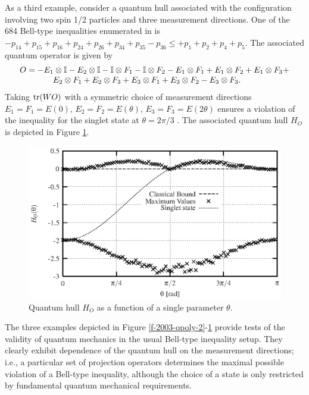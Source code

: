 As a third example, consider a quantum hull associated with the
configuration involving two spin 1/2 particles and
three measurement directions. One of the 684 Bell-type inequalities enumerated in
\cite{2000-poly} is
$  - p_{14} + p_{15} + p_{16} +
  p_{24} + p_{26} + p_{34} + p_{35} - p_{36} \leq +p_{1}+ p_{2} + p_{4} + p_{5}$.
The associated quantum operator is given by
\begin{equation}
\begin{array}{l}
  O=- {E}_1 \otimes {\Bbb I} - {E}_2 \otimes {\Bbb I} - {\Bbb I} \otimes {F}_1 - {\Bbb I} \otimes
  {F}_2 -
  {E}_1 \otimes {F}_1 + {E}_1 \otimes {F}_2 + {E}_1 \otimes {F}_3 +\\
\qquad \qquad {E}_2
  \otimes {F}_1 + {E}_2 \otimes {F}_3 +
  {E}_3 \otimes {F}_1 + {E}_3 \otimes {F}_2 - {E}_3 \otimes {F}_3.
\end{array}
  \label{e-2003-poly-xyz}
\end{equation}
Taking ${\rm tr}(WO)$ with a symmetric choice of measurement
directions
${E}_1={F}_1=E(0)$,
${E}_2={F}_2=E(\theta)$,
${E}_3={F}_3=E(2\theta)$ ensures a violation of the inequality for the
singlet state at $\theta=2\pi/3$ \cite{2000-poly}.
The associated
quantum hull  $H_{O}$ is depicted in Figure  \ref{f-2003-plotpit}.
\begin{figure}
  \centering
  \includegraphics{2003-qpoly-plotpit}
  \caption{Quantum hull $H_{O}$  as a function of a single parameter $\theta$.}
  \label{f-2003-plotpit}
\end{figure}

The three examples depicted in Figure
\ref{f-2003-qpoly-2}-\ref{f-2003-plotpit} provide tests of the
validity of quantum mechanics in the usual Bell-type inequality setup.
They clearly exhibit dependence of
the quantum hull on
the measurement directions; i.e.,
 a particular set of
projection operators determines the maximal possible violation of a
Bell-type inequality, although the choice of a state is only
restricted by fundamental quantum mechanical requirements.


